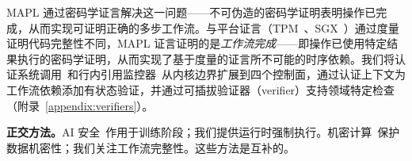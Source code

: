 MAPL 通过密码学证言解决这一问题——不可伪造的密码学证明表明操作已完成，从而实现可证明正确的多步工作流。与平台证言（TPM~\cite{tcg2016}、SGX~\cite{costan2016intel}）通过度量证明代码完整性不同，MAPL 证言证明的是\textit{工作流完成}——即操作已使用特定结果执行的密码学证明，从而实现了基于度量的证言所不可能的时序依赖。我们将认证系统调用~\cite{rajagopalan2006}和行内引用监控器~\cite{erlingsson2004,schneider2000}从内核边界扩展到四个控制面，通过认证上下文为工作流依赖添加有状态验证，并通过可插拔验证器（verifier）支持领域特定检查（附录~\ref{appendix:verifiers}）。

\textbf{正交方法。}AI 安全~\cite{constitutional_ai2022,ouyang2022training,ganguli2022redteaming}作用于训练阶段；我们提供运行时强制执行。机密计算~\cite{costan2016intel,gentry2009fully}保护数据机密性；我们关注工作流完整性。这些方法是互补的。
